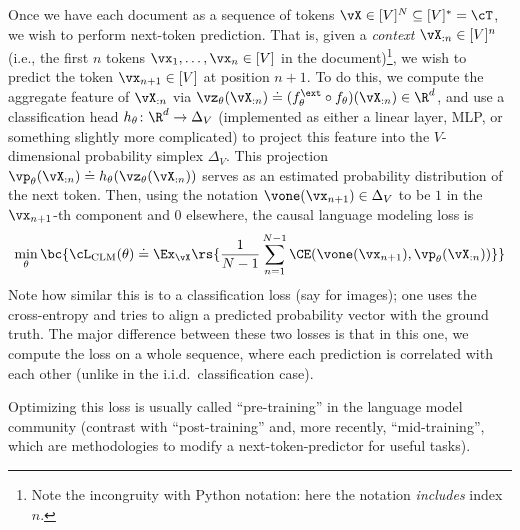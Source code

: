 \documentclass[../../book-main.tex]{subfiles}
\begin{document}
Once we have each document as a sequence of tokens \(\vX \in [V]^{N} \subseteq [V]^{*} = \cT\), we wish to perform next-token prediction. That is, given a \textit{context} \(\vX_{:n} \in [V]^{n}\) (i.e., the first \(n\) tokens \(\vx_{1}, \dots, \vx_{n} \in [V]\) in the document)\footnote{Note the incongruity with Python notation: here the notation \textit{includes} index \(n\).}, we wish to predict the token \(\vx_{n + 1} \in [V]\) at position \(n + 1\). To do this, we compute the aggregate feature of \(\vX_{:n}\) via \(\vz_{\theta}(\vX_{:n}) \doteq (f_{\theta}^{\ext} \circ f_{\theta})(\vX_{:n}) \in \R^{d}\), and use a classification head \(h_{\theta} \colon \R^{d} \to \Delta_{V}\) (implemented as either a linear layer, MLP, or something slightly more complicated) to project this feature into the \(V\)-dimensional probability simplex \(\Delta_{V}\). This projection \(\vp_{\theta}(\vX_{:n}) \doteq h_{\theta}(\vz_{\theta}(\vX_{:n}))\) serves as an estimated probability distribution of the next token. Then, using the notation \(\vone(\vx_{n + 1}) \in \Delta_{V}\) to be \(1\) in the \(\vx_{n + 1}\)-th component and \(0\) elsewhere, the causal language modeling loss is
\begin{equation}\label{eq:clm_loss}
    \min_{\theta}\bc{\cL_{\mathrm{CLM}}(\theta) \doteq \Ex_{\vX}\rs{\frac{1}{N - 1}\sum_{n = 1}^{N - 1}\CE(\vone(\vx_{n + 1}), \vp_{\theta}(\vX_{:n}))}}
\end{equation}
Note how similar this is to a classification loss (say for images); one uses the cross-entropy and tries to align a predicted probability vector with the ground truth. The major difference between these two losses is that in this one, we compute the loss on a whole sequence, where each prediction is correlated with each other (unlike in the i.i.d.~classification case). 

Optimizing this loss is usually called ``pre-training'' in the language model community (contrast with ``post-training'' and, more recently, ``mid-training'', which are methodologies to modify a next-token-predictor for useful tasks).
\end{document}
